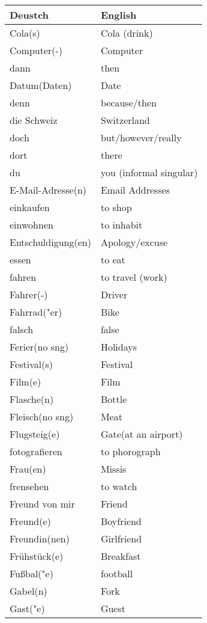 \documentclass{article}
\renewcommand{\arraystretch}{1}
\begin{document}
\hfill
\begin{minipage}{0.48\textwidth}
    \centering
    \renewcommand{\arraystretch}{1.5}
    \begin{tabular}{|>{\raggedright\arraybackslash}p{3.5cm}|>{\raggedright\arraybackslash}p{3.5cm}|}
        \hline
        \rowcolor{gray!20} \textbf{Deustch} & \textbf{English} \\
        \hline
        Cola(s) & Cola (drink) \\\hline
        Computer(-) & Computer \\\hline
        dann & then \\\hline
        Datum(Daten) & Date \\\hline
        denn & because/then \\\hline
        die Schweiz & Switzerland \\\hline
        doch & but/however/really \\\hline
        dort & there \\\hline
        du & you (informal singular) \\\hline
        E-Mail-Adresse(n) & Email Addresses \\\hline
        einkaufen & to shop \\\hline
        einwohnen & to inhabit \\\hline
        Entschuldigung(en) & Apology/excuse \\\hline
        essen & to eat \\\hline
        fahren & to travel (work) \\\hline
        Fahrer(-) & Driver \\\hline
        Fahrrad("er) & Bike \\\hline
        falsch & false \\\hline
        Ferier(no sng) & Holidays \\\hline
        Festival(s) & Festival \\\hline
        Film(e) & Film \\\hline
        Flasche(n) & Bottle \\\hline
        Fleisch(no sng) & Meat \\\hline
        Flugsteig(e) & Gate(at an airport) \\\hline
        fotografieren & to phorograph \\\hline
        Frau(en) & Missis \\\hline
        frensehen & to watch  \\\hline
        Freund von mir & Friend \\\hline
        Freund(e) & Boyfriend \\\hline
        Freundin(nen) & Girlfriend \\\hline
        Frühstück(e) & Breakfast \\\hline
        Fu\ss{}bal("e) & football \\\hline
        Gabel(n) & Fork \\\hline
        Gast("e) & Guest \\\hline
    \end{tabular}
\end{minipage}
\end{document}
